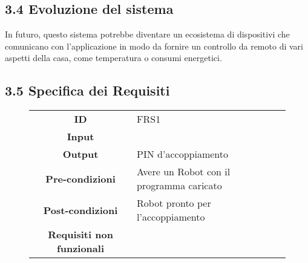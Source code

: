 \documentclass[]{article}
\begin{document}
\hypertarget{evoluzione-del-sistema}{%
\subsection{3.4 Evoluzione del sistema}\label{evoluzione-del-sistema}}

In futuro, questo sistema potrebbe diventare un ecosistema di
dispositivi che comunicano con l'applicazione in modo da fornire un
controllo da remoto di vari aspetti della casa, come temperatura o
consumi energetici.

\hypertarget{specifica-dei-requisiti}{%
\subsection{3.5 Specifica dei Requisiti}\label{specifica-dei-requisiti}}

\begin{figure}[htbp]
\centering
\begin{tabular}{|c|l|}
\hline
\textbf{ID} & FRS1\\
\textbf{Input} &\\
\textbf{Output} & PIN d'accoppiamento\\
\textbf{Pre-condizioni} & Avere un Robot con il programma
caricato\\
\textbf{Post-condizioni} & Robot pronto per
l'accoppiamento\\
\textbf{Requisiti non funzionali} &\\
\hline
\end{tabular}
\end{figure}

~
\end{document}

